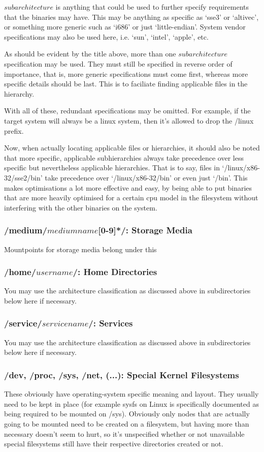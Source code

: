 \documentclass[a4paper,twoside,titlepage]{article}
\begin{document}
$subarchitecture$ is anything that could be used to further specify requirements
that the binaries may have. This may be anything as specific as `sse3' or
`altivec', or something more generic such as `i686' or just `little-endian'.
System vendor specifications may also be used here, i.e. `sun', `intel',
`apple', etc.

As should be evident by the title above, more than one $subarchitecture$
specification may be used. They must still be specified in reverse order of
importance, that is, more generic specifications must come first, whereas
more specific details should be last. This is to faciliate finding applicable
files in the hierarchy.

With all of these, redundant specifications may be omitted. For example, if the
target system will always be a linux system, then it's allowed to drop the
/linux prefix.

Now, when actually locating applicable files or hierarchies, it should also be
noted that more specific, applicable subhierarchies always take precedence over
less specific but nevertheless applicable hierarchies. That is to say, files in
`/linux/x86-32/sse2/bin' take precedence over `/linux/x86-32/bin' or even just
`/bin'. This makes optimisations a lot more effective and easy, by being able to
put binaries that are more heavily optimised for a certain cpu model in the
filesystem without interfering with the other binaries on the system.

\subsubsection{/medium/$mediumname$[0-9]*/: Storage Media}
Mountpoints for storage media belong under this

\subsubsection{/home/$username$/: Home Directories}
You may use the architecture classification as discussed above in subdirectories
below here if necessary.

\subsubsection{/service/$servicename$/: Services}
You may use the architecture classification as discussed above in subdirectories
below here if necessary.

\subsubsection{/dev, /proc, /sys, /net, (...): Special Kernel Filesystems}
These obviously have operating-system specific meaning and layout. They usually
need to be kept in place (for example sysfs on Linux is specifically documented
as being required to be mounted on /sys). Obviously only nodes that are actually
going to be mounted need to be created on a filesystem, but having more than
necessary doesn't seem to hurt, so it's unspecified whether or not unavailable
special filesystems still have their respective directories created or not.
\end{document}
